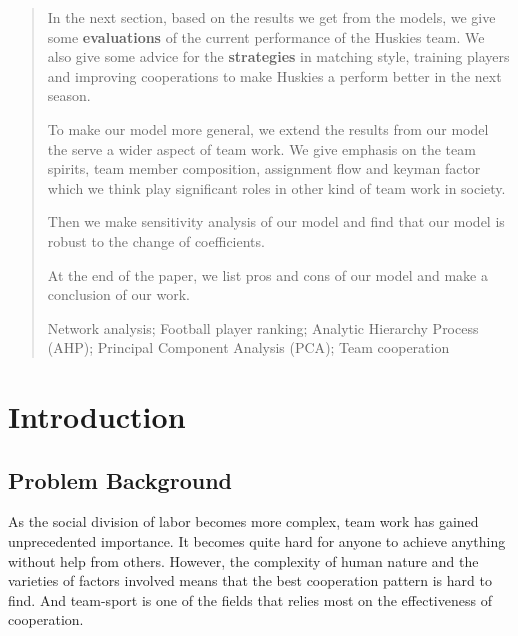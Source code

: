 \documentclass[12pt]{mcmthesis}
\begin{document}
\begin{abstract}
		In the next section, based on the results we get from the models, we give some \textbf{evaluations} of the current performance of the Huskies team. We also give some advice for the \textbf{strategies} in matching style, training players and improving cooperations to make Huskies a perform better in the next season. 
		
		To make our model more general, we extend the results from our model the serve a wider aspect of team work. We give emphasis on the team spirits, team member composition, assignment flow and keyman factor which we think play significant roles in other kind of team work in society. 
		
		Then we make sensitivity analysis of our model and find that our model is robust to the change of coefficients. 
		
		At the end of the paper, we list pros and cons of our model and make a conclusion of our work.
		
		\begin{keywords}
		Network analysis; Football player ranking; Analytic Hierarchy Process (AHP); Principal Component Analysis ({PCA}); Team cooperation
		\end{keywords}
	\end{abstract}
\maketitle

\tableofcontents

\newpage
\section{Introduction}
\subsection{Problem Background}
	As the social division of labor becomes more complex, team work has gained unprecedented importance. It becomes quite hard for anyone to achieve anything without help from others. However, the complexity of human nature and the varieties of factors involved means that the best cooperation pattern is hard to find. And team-sport is one of the fields that relies most on the effectiveness of cooperation. 
	
\end{document}
